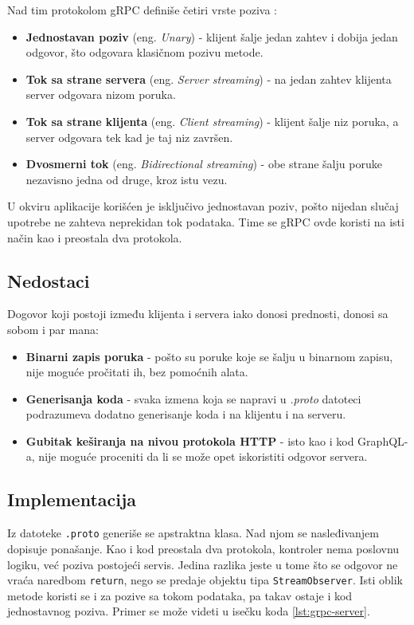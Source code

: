 \documentclass[12pt,oneside]{memoir}
\begin{document}
Nad tim protokolom gRPC definiše četiri vrste poziva \cite{indrasiri2020}:

\begin{itemize}
  \item \textbf{Jednostavan poziv} (eng. \textit{Unary}) - klijent šalje jedan zahtev i dobija
  jedan odgovor, što odgovara klasičnom pozivu metode.
  \item \textbf{Tok sa strane servera} (eng. \textit{Server streaming}) - na jedan zahtev
  klijenta server odgovara nizom poruka.
  \item \textbf{Tok sa strane klijenta} (eng. \textit{Client streaming}) - klijent šalje niz
  poruka, a server odgovara tek kad je taj niz završen.
  \item \textbf{Dvosmerni tok} (eng. \textit{Bidirectional streaming}) - obe strane šalju poruke
  nezavisno jedna od druge, kroz istu vezu.
\end{itemize}

U okviru aplikacije korišćen je isključivo jednostavan poziv, pošto nijedan slučaj upotrebe ne
zahteva neprekidan tok podataka. Time se gRPC ovde koristi na isti način kao i preostala dva
protokola.

\subsection{Nedostaci}

Dogovor koji postoji između klijenta i servera iako donosi prednosti, donosi sa sobom i par mana:


\begin{itemize}
  \item \textbf{Binarni zapis poruka} - pošto su poruke koje se šalju u binarnom zapisu, 
  nije moguće pročitati ih, bez pomoćnih alata.
  \item \textbf{Generisanja koda} - svaka izmena koja se napravi u \textit{.proto} datoteci podrazumeva 
  dodatno generisanje koda i na klijentu i na serveru.
  \item \textbf{Gubitak keširanja na nivou protokola HTTP} - isto kao i kod GraphQL-a, nije moguće proceniti 
  da li se može opet iskoristiti odgovor servera.
\end{itemize}

\subsection{Implementacija}

Iz datoteke \texttt{.proto} generiše se apstraktna klasa. Nad njom se nasleđivanjem dopisuje
ponašanje. Kao i kod preostala dva protokola, kontroler nema poslovnu logiku, već poziva postojeći
servis. Jedina razlika jeste u tome što se odgovor ne vraća naredbom \texttt{return}, nego se
predaje objektu tipa \texttt{StreamObserver}. Isti oblik metode koristi se i za pozive sa tokom
podataka, pa takav ostaje i kod jednostavnog poziva. Primer se može videti u isečku koda
\ref{lst:grpc-server}.
\end{document}
